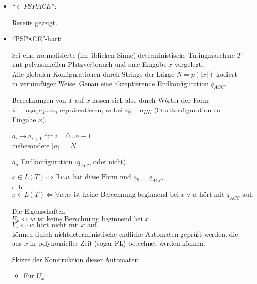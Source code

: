 \begin{beweis}
    
    \begin{itemize}
        
        \item ``$\in PSPACE$'':

        Bereits gezeigt.


        \item ``PSPACE''-hart:

        Sei eine normalisierte (im üblichen Sinne) deterministische Turingmaschine $T$ mit polynomiellen Platzverbrauch und eine Eingabe $x$ vorgelegt.
        \\
        Alle globalen Konfigurationen durch Strings der Länge $N = p(|x|)$ kodiert in vernünftiger Weise. Genau eine akzeptierende Endkonfiguration $q_{ACC}$.

        Berechnungen von $T$ auf $x$ lassen sich also durch Wörter der Form $w = a_0 a_1 a_2 \dots a_n$ repräsentieren, wobei $a_0 = a_{INI}$ (Startkonfiguration zu Eingabe $x$).

        $a_i \rightarrow a_{i+1} $ für $i = 0 \dots n-1$
        \\
        insbesondere $|a_i| = N$

        $a_n$ Endkonfiguration ($q_{ACC}$ oder nicht).

        $x \in L(T) \Leftrightarrow \exists w . w \text{ hat diese Form und } a_n = q_{ACC}$
        \\d.\,h. 
        $x \in L(T) \Leftrightarrow \forall w . w \text{ ist keine Berechnung beginnend bei } x \lor w \text{ hört mit } q_{ACC} \text{ auf. }$

        Die Eigenschaften
        \\
        $U_x \Longleftrightarrow w \text{ ist keine Berechnung beginnend bei } x $
        \\
        $V_x \Longleftrightarrow w \text{ hört nicht mit } x \text{ auf. }$
        \\
        können durch nichtdeterministische endliche Automaten geprüft werden, die aus $x$ in polynomieller Zeit (sogar FL) berechnet werden können.

        Skizze der Konstruktion dieser Automaten: 
        \begin{itemize}

            \item Für $U_x$:


\end{itemize}
\end{itemize}
\end{beweis}
